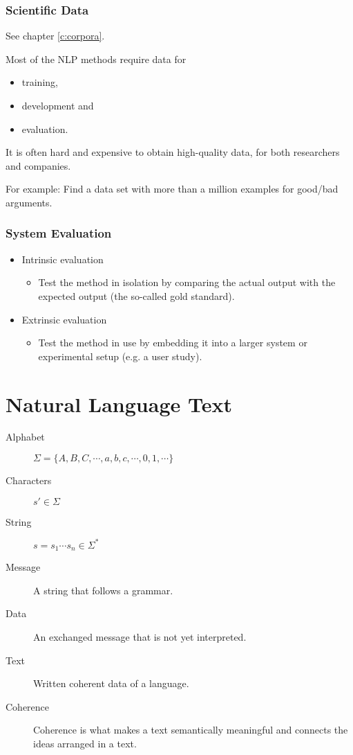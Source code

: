		\subsection{Scientific Data} %
			See chapter \ref{c:corpora}.

			Most of the NLP methods require data for
			\begin{itemize}
				\item training,
				\item development and
				\item evaluation.
			\end{itemize}
			It is often hard and expensive to obtain high-quality data, for both researchers and companies.

			For example: Find a data set with more than a million examples for good/bad arguments.

		\subsection{System Evaluation} %
			\begin{itemize}
				\item Intrinsic evaluation
					\begin{itemize}
						\item Test the method in isolation by comparing the actual output with the expected output (the so-called gold standard).
					\end{itemize}
				\item Extrinsic evaluation
					\begin{itemize}
						\item Test the method in use by embedding it into a larger system or experimental setup (e.g. a user study).
					\end{itemize}
			\end{itemize}

\chapter{Natural Language Text} %
	\begin{description}
		\item[Alphabet] \( \Sigma = \{ A, B, C, \cdots, a, b, c, \cdots, 0, 1, \cdots \} \)
		\item[Characters] \( s'\in \Sigma \)
		\item[String] \( s = s_1 \cdots s_n \in \Sigma^* \)
		\item[Message] A string that follows a grammar.
		\item[Data] An exchanged message that is not yet interpreted.
		\item[Text] Written coherent data of a language.
		\item[Coherence] Coherence is what makes a text semantically meaningful and connects the ideas arranged in a text.
	\end{description}


